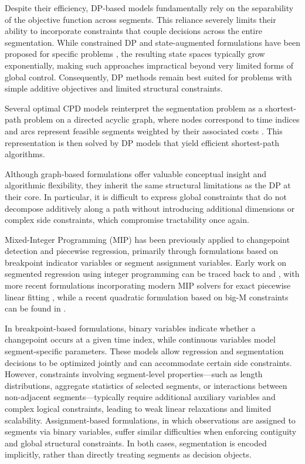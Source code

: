 \documentclass[preprints,article,submit,pdftex,moreauthors]{Definitions/mdpi}
\begin{document}
Despite their efficiency, DP-based models fundamentally rely on the separability of the objective function across segments. This reliance severely limits their ability to incorporate constraints that couple decisions across the entire segmentation. While constrained DP and state-augmented formulations have been proposed for specific problems \cite{HRFB13}, the resulting state spaces typically grow exponentially, making such approaches impractical beyond very limited forms of global control. Consequently, DP methods remain best suited for problems with simple additive objectives and limited structural constraints.

Several optimal CPD models reinterpret the segmentation problem as a shortest-path problem on a directed acyclic graph, where nodes correspond to time indices and arcs represent feasible segments weighted by their associated costs \cite{B61,PC75}. This representation is then solved by DP models that yield efficient shortest-path algorithms.

Although graph-based formulations offer valuable conceptual insight and algorithmic flexibility, they inherit the same structural limitations as the DP at their core. In particular, it is difficult to express global constraints that do not decompose additively along a path without introducing additional dimensions or complex side constraints, which compromise tractability once again.

Mixed-Integer Programming (MIP) has been previously applied to changepoint detection and piecewise regression, primarily through formulations based on breakpoint indicator variables or segment assignment variables. Early work on segmented regression using integer programming can be traced back to \cite{H66} and \cite{F58}, with more recent formulations incorporating modern MIP solvers for exact piecewise linear fitting \cite{BKM16}, while a recent quadratic formulation based on big-M constraints can be found in \cite{PRSS25}.

In breakpoint-based formulations, binary variables indicate whether a changepoint occurs at a given time index, while continuous variables model segment-specific parameters. These models allow regression and segmentation decisions to be optimized jointly and can accommodate certain side constraints. However, constraints involving segment-level properties—such as length distributions, aggregate statistics of selected segments, or interactions between non-adjacent segments—typically require additional auxiliary variables and complex logical constraints, leading to weak linear relaxations and limited scalability.
Assignment-based formulations, in which observations are assigned to segments via binary variables, suffer similar difficulties when enforcing contiguity and global structural constraints. In both cases, segmentation is encoded implicitly, rather than directly treating segments as decision objects.
\end{document}
